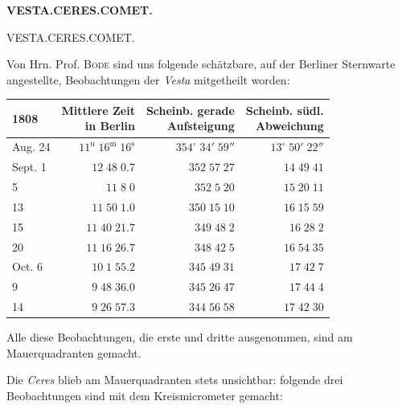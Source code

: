 \clearpage
\thispagestyle{empty}
\noindent{}%
%
\parbox[t]{\dimexpr\linewidth-24mm\relax}{\centering\footnotesize\bfseries VESTA.\quad CERES.\quad COMET.\par}%
\makebox[12mm][r]{}\par\nobreak\medskip
\begin{center}
\large VESTA.\quad CERES.\quad COMET.
\end{center}

Von Hrn. Prof. \textsc{Bode} sind uns folgende schätzbare, auf der Berliner Sternwarte angestellte, Beobachtungen der \emph{Vesta} mitgetheilt worden:


\begin{center}\fontsize{10}{12}\selectfont\setlength{\tabcolsep}{5pt}\renewcommand{\arraystretch}{1.15}\begin{tabular}{lrrr}
1808 & \shortstack{Mittlere Zeit\\in Berlin} & \shortstack{Scheinb. gerade\\Aufsteigung} & \shortstack{Scheinb. südl.\\Abweichung}\\
\hline
Aug. 24 & $11^{\text{u}}\;16^{\text{m}}\;16^{\text{s}}$ & $354^\circ\;34'\;59''$ & $13^\circ\;50'\;22''$\\
Sept. 1 & $12\;48\;0.7$ & $352\;57\;27$ & $14\;49\;41$\\
5 & $11\;8\;0$ & $352\;5\;20$ & $15\;20\;11$\\
13 & $11\;50\;1.0$ & $350\;15\;10$ & $16\;15\;59$\\
15 & $11\;40\;21.7$ & $349\;48\;2$ & $16\;28\;2$\\
20 & $11\;16\;26.7$ & $348\;42\;5$ & $16\;54\;35$\\
Oct. 6 & $10\;1\;55.2$ & $345\;49\;31$ & $17\;42\;7$\\
9 & $9\;48\;36.0$ & $345\;26\;47$ & $17\;44\;4$\\
14 & $9\;26\;57.3$ & $344\;56\;58$ & $17\;42\;30$\\
\end{tabular}\end{center}


\par\indent Alle diese Beobachtungen, die erste und dritte ausgenommen, sind am Mauerquadranten gemacht.

\par\indent Die \emph{Ceres} blieb am Mauerquadranten stets unsichtbar: folgende drei Beobachtungen sind mit dem
Kreismicrometer gemacht:


